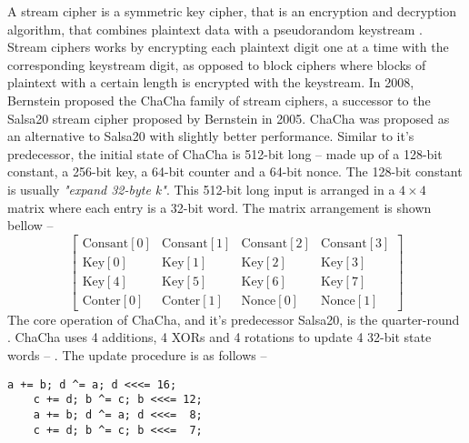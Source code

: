 \documentclass{article}
\begin{document}
A stream cipher is a symmetric key cipher, that is an encryption and decryption algorithm, that combines plaintext data with a pseudorandom keystream \cite{robshaw1995stream}. Stream ciphers works by encrypting each plaintext digit one at a time with the corresponding keystream digit, as opposed to block ciphers where blocks of plaintext with a certain length is encrypted with the keystream. In 2008, Bernstein proposed the ChaCha family of stream ciphers, a successor to the Salsa20 stream cipher \cite{bernstein2005salsa20} proposed by Bernstein in 2005. ChaCha was proposed as an alternative to Salsa20 \cite{bernstein2008chachaFamily} with slightly better performance. Similar to it's predecessor, the initial state of ChaCha is 512-bit long -- made up of a 128-bit constant, a 256-bit key, a 64-bit counter and a 64-bit nonce. The 128-bit constant is usually \textit{"expand 32-byte k"}. This 512-bit long input is arranged in a $4\times4$ matrix where each entry is a 32-bit word. The matrix arrangement is shown bellow --
\begin{equation}\label{initialState}
    \left[
        \begin{array}{cccc}
            \text{Consant}[0] & \text{Consant}[1] & \text{Consant}[2] & \text{Consant}[3] \\
            \text{Key}[0]     & \text{Key}[1]     & \text{Key}[2]     & \text{Key}[3]     \\
            \text{Key}[4]     & \text{Key}[5]     & \text{Key}[6]     & \text{Key}[7]     \\
            \text{Conter}[0]  & \text{Conter}[1]  & \text{Nonce}[0]   & \text{Nonce}[1]
        \end{array}
        \right]
\end{equation}
The core operation of ChaCha, and it's predecessor Salsa20, is the quarter-round . ChaCha uses 4 additions, 4 XORs and 4 rotations to update 4 32-bit state words -- . The update procedure is as follows --
\begin{lstlisting}[basicstyle=\ttfamily,frame=none]
    a += b; d ^= a; d <<<= 16;
    c += d; b ^= c; b <<<= 12;
    a += b; d ^= a; d <<<=  8;
    c += d; b ^= c; b <<<=  7;
\end{lstlisting}
\end{document}
